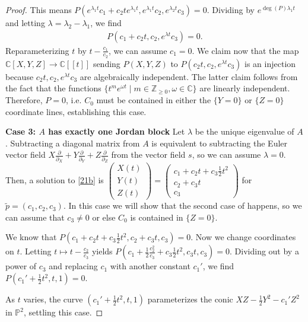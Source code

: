 \documentclass[11pt,reqno]{amsart}
\theoremstyle{plain}
\theoremstyle{definition}
\theoremstyle{remark}
\numberwithin{equation}{section}
\renewcommand{\to}{{\longrightarrow}}
\numberwithin{equation}{section}
\newcommand{\PP}{\mathbb{P}}
\begin{document}
\begin{proof}
This means $P(e^{\lambda_1 t} c_1 + c_2 te^{\lambda_1 t} , e^{\lambda_1 t} c_2 , e^{\lambda_2 t} c_3)=0$. Dividing by $e^{\deg(P)\lambda_1t}$ and letting $\lambda = \lambda_2-\lambda_1$, we find
\begin{align*}
    P(c_1+c_2 t, c_2, e^{\lambda t} c_3)=0.
\end{align*}
Reparameterizing $t$ by $t-\frac{c_1}{c_2}$, we can assume $c_1=0$. We claim now that the map $\mathbb{C}[X,Y,Z]\to \mathbb{C}[[t]]$ sending $P(X,Y,Z)$ to $P(c_2 t, c_2, e^{\lambda t} c_3)$ is an injection because $c_2 t, c_2, e^{\lambda t} c_3$ are algebraically independent. The latter claim follows from the fact that the  functions $\{t^me^{\omega t}\mid m\in \mathbb{Z}_{\geq 0}, \omega \in \mathbb{C}\}$ are linearly independent. Therefore, $P=0$, i.e. $C_0$ must be contained in either the $\{Y=0\}$ or $\{Z=0\}$ coordinate lines, establishing this case.

\textbf{Case 3: $A$ has exactly one Jordan block}
Let $\lambda$ be the unique eigenvalue of $A$. Subtracting a diagonal matrix from $A$ is equivalent to subtracting the Euler vector field $X\frac{\partial}{\partial_X}+Y\frac{\partial}{\partial_Y}+Z\frac{\partial}{\partial_Z}$ from the vector field $s$, so we can assume $\lambda=0$. Then, a solution to \eqref{21b} is $\begin{pmatrix} X(t) \\ Y(t) \\ Z(t)\end{pmatrix}=\begin{pmatrix}  c_1 + c_2 t + c_3 \frac{1}{2}t^2 \\  c_2+c_3t \\c_3\end{pmatrix}$ for $\widetilde{p}=(c_1,c_2,c_3)$. In this case we will show that the second case of  happens, so we can assume that $c_3\neq 0$ or else $C_{0}$ is contained in $\{Z=0\}$.

We know that $P( c_1 + c_2 t + c_3 \frac{1}{2}t^2 , c_2+c_3t , c_3)=0$. Now we change coordinates on $t$. Letting $t\mapsto t-\frac{c_2}{c_3}$ yields $P( c_1 +\frac{1}{2}\frac{c_2^2}{c_3} + c_3 \frac{1}{2}t^2, c_3t, c_3)=0$. Dividing out by a power of $c_3$ and replacing $c_1$ with another constant $c_1'$, we find $P( c_1'+ \frac{1}{2}t^2, t, 1)=0$.

As $t$ varies, the curve $(c_1'+ \frac{1}{2}t^2, t, 1)$ parameterizes the conic $XZ-\frac{1}{2}Y^2-c_1'Z^2$ in $\PP^2$, settling this case.
\end{proof}
\end{document}
